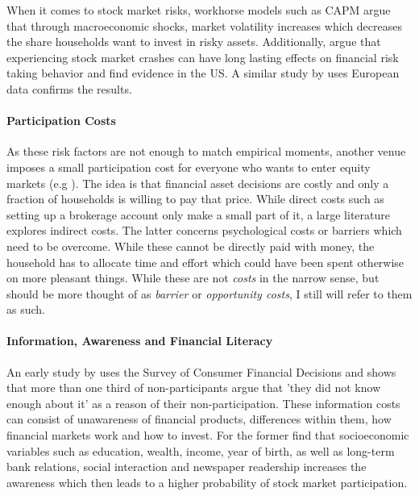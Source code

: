 \documentclass[ProjectABM]{subfiles}
\begin{document}
When it comes to stock market risks, workhorse models such as CAPM argue that through macroeconomic shocks, market volatility increases which decreases the share households want to invest in risky assets. Additionally, \cite{malmendier_2011} argue that experiencing stock market crashes can have long lasting effects on financial risk taking behavior and find evidence in the US. A similar study by \cite{ampudia_ehrmann_2017macroeconomic} uses European data confirms the results. 

\paragraph{Participation Costs}
As these risk factors are not enough to match empirical moments, another venue imposes a small participation cost for everyone who wants to enter equity markets (e.g \cite{vissing_2003, HM2003portfolio, GM2005portfolio}). The idea is that financial asset decisions are costly and only a fraction of households is willing to pay that price. While direct costs such as setting up a brokerage account only make a small part of it, a large literature explores indirect costs. The latter concerns psychological costs or barriers which need to be overcome. While these cannot be directly paid with money, the household has to allocate time and effort which could have been spent otherwise on more pleasant things. While these are not \textit{costs} in the narrow sense, but should be more thought of as \textit{barrier} or \textit{opportunity costs}, I still will refer to them as such.


\paragraph{Information, Awareness and Financial Literacy}
An early study by \cite{king_leape_1987asset} uses the Survey of Consumer Financial Decisions and shows that more than one third of non-participants argue that 'they did not know enough about it' as a reason of their non-participation. These information costs can consist of unawareness of financial products, differences within them, how financial markets work and how to invest.%
For the former \cite{guiso_jappelli_2005} find that socioeconomic variables such as education, wealth, income, year of birth, as well as long-term bank relations, social interaction and newspaper readership increases the awareness which then leads to a higher probability of stock market participation. 
\end{document}

